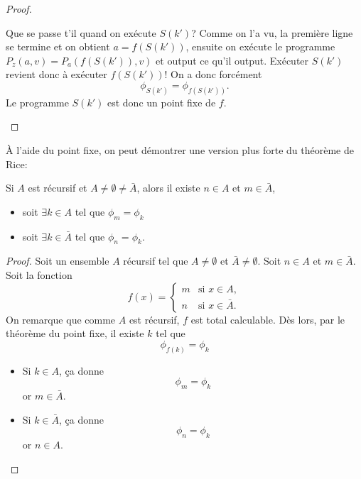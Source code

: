 \begin{proof}
\begin{myrem}
          Que se passe t'il quand on exécute $S(k')$?
          Comme on l'a vu, la première ligne se termine et on obtient
          $a = f(S(k'))$,
          ensuite on exécute le programme $P_z(a,v) = P_a(f(S(k')),v)$
          et output ce qu'il output.
          Exécuter $S(k')$ revient donc à exécuter $f(S(k'))$!
          On a donc forcément
          \[ \phi_{S(k')} = \phi_{f(S(k'))}. \]
          Le programme $S(k')$ est donc un point fixe de $f$.
		\end{myrem}
\end{proof}

\begin{myrem}
  À l'aide du point fixe, on peut démontrer une version plus forte du théorème de Rice:

  Si $A$ est récursif et $A \neq \emptyset \neq \bar{A}$, alors
  il existe $n \in A$ et $m \in \bar{A}$,
  \begin{itemize}
    \item soit $\exists k \in      A $ tel que $\phi_m = \phi_k$
    \item soit $\exists k \in \bar{A}$ tel que $\phi_n = \phi_k$.
  \end{itemize}
  \begin{proof}
    Soit un ensemble $A$ récursif tel que $A \neq \emptyset$ et $\bar{A} \neq \emptyset$.
    Soit $n \in A$ et $m \in \bar{A}$.
    Soit la fonction
    \[
      f(x) =
      \begin{cases}
        m & \text{si }x \in A,\\
        n & \text{si }x \in \bar{A}.
      \end{cases}
    \]
    On remarque que comme $A$ est récursif,
    $f$ est total calculable.
    Dès lors, par le théorème du point fixe, il existe $k$ tel que
    \[ \phi_{f(k)} = \phi_k \]
    \begin{itemize}
      \item Si $k \in A$, ça donne
        \[ \phi_m = \phi_k \]
        or $m \in \bar{A}$.
      \item Si $k \in \bar{A}$, ça donne
        \[ \phi_n = \phi_k \]
        or $n \in A$.
    \end{itemize}
  \end{proof}
\end{myrem}


